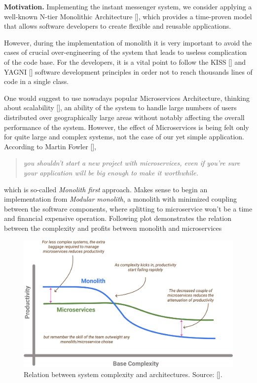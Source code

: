 \textbf{Motivation.} Implementing the instant messenger system, we consider applying a well-known N-tier
Monolithic Architecture [\cite{bucchiarone2018monolithic}], which provides a time-proven model that allows software
developers to create flexible and reusable applications.

However, during the implementation of monolith it is very important to avoid the cases of crucial over-engineering
of the system that leads to useless complication of the code base.
For the developers, it is a vital point to follow the KISS [\cite{alwin2016kiss}] and YAGNI [\cite{da2018evolution}]
software development principles in order not to reach thousands lines of code in a single class.

One would suggest to use nowadays popular Microservices Architecture, thinking about scalability [\cite{brataas2004exploring}],
an ability of the system to handle large numbers of users distributed over geographically large areas without
notably affecting the overall performance of the system.
However, the effect of Microservices is being felt only for quite large and complex systems,
not the case of our yet simple application.
According to Martin Fowler [\cite{fowler2015monolith}],
\begin{quote}
    \textit{you shouldn't start a new project with microservices, even if you're sure your application will be big enough to
    make it worthwhile.}
\end{quote}
which is so-called \textit{Monolith first} approach.
Makes sense to begin an implementation from \textit{Modular monolith}, a monolith with minimized coupling between the
software components, where splitting to microservice won't be a time and financial expensive operation.
Following plot demonstrates the relation between the complexity and profits between monolith and microservices

\begin{figure}[H]
    \centering
    \includegraphics[width=1\textwidth]{Pictures/02_Monolith_and_Microservices_complexity}
    \caption{Relation between system complexity and architectures. Source: [\cite{fowler2015microsevices}].}
    \label{fig:monolith_vs_microservice}
\end{figure}

